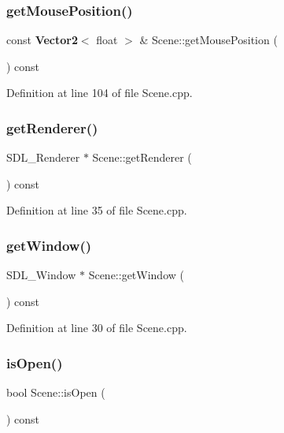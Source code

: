 \mbox{\label{class_scene_a57a096711a009b7205069b2afd57d778}} 
\subsubsection{get\+Mouse\+Position()}
{\footnotesize\ttfamily const \textbf{ Vector2}$<$ float $>$ \& Scene\+::get\+Mouse\+Position (\begin{DoxyParamCaption}{ }\end{DoxyParamCaption}) const}



Definition at line 104 of file Scene.\+cpp.

\mbox{\label{class_scene_a2c0b5af09495ff8af64fb3c52197f49e}} 
\subsubsection{get\+Renderer()}
{\footnotesize\ttfamily S\+D\+L\+\_\+\+Renderer $\ast$ Scene\+::get\+Renderer (\begin{DoxyParamCaption}{ }\end{DoxyParamCaption}) const}



Definition at line 35 of file Scene.\+cpp.

\mbox{\label{class_scene_a25f8bfdf43742caa7209f74a82356b31}} 
\subsubsection{get\+Window()}
{\footnotesize\ttfamily S\+D\+L\+\_\+\+Window $\ast$ Scene\+::get\+Window (\begin{DoxyParamCaption}{ }\end{DoxyParamCaption}) const}



Definition at line 30 of file Scene.\+cpp.

\mbox{\label{class_scene_a1b5e495f69d81182bb6dcaebd1edb669}} 
\subsubsection{is\+Open()}
{\footnotesize\ttfamily bool Scene\+::is\+Open (\begin{DoxyParamCaption}{ }\end{DoxyParamCaption}) const}



